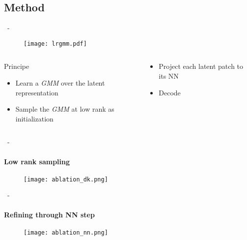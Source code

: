 \documentclass[aspectratio=169, 22pt]{beamer}
\begin{document}
\subsection{Method}
\begin{frame}{\secname~- \subsecname}
  \begin{figure}
    \texttt{[image: lrgmm.pdf]}
  \end{figure}
  \begin{columns}
    \begin{column}{0.5\linewidth}
      \begin{exampleblock}{Principe}
        \begin{itemize}
        \item \small Learn a \emph{GMM} over the latent representation
        \item \small Sample the \emph{GMM} at low rank as initialization
        \end{itemize}
      \end{exampleblock}
    \end{column}
    \begin{column}{0.5\linewidth}
        \begin{exampleblock}{}
        \begin{itemize}
        \item \small Project each latent patch to its NN
        \item \small Decode
        \end{itemize}
      \end{exampleblock}
    \end{column}
  \end{columns}
  
\end{frame}

\begin{frame}{\secname~- \subsecname}
  \framesubtitle{Low rank sampling} 
  \begin{figure}
    \texttt{[image: ablation\_dk.png]}
  \end{figure}  
\end{frame}

\begin{frame}{\secname~- \subsecname}
  \framesubtitle{Refining through NN step}
  \begin{figure}
    \texttt{[image: ablation\_nn.png]}
  \end{figure}    
\end{frame}
\end{document}
